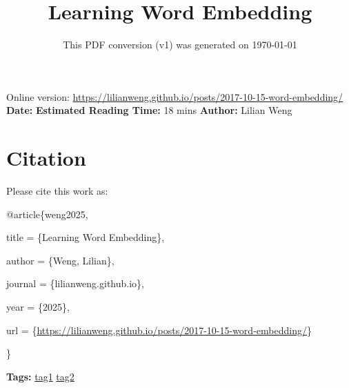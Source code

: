 \documentclass[12pt]{article}
\title{Learning Word Embedding}
\date{This PDF conversion (v1) was generated on \today\footnotemark}
\begin{document}
\maketitle
\begin{center}
    Online version: \url{https://lilianweng.github.io/posts/2017-10-15-word-embedding/} \\
    \textbf{Date:} \quad
    \textbf{Estimated Reading Time:}  18 mins \quad
    \textbf{Author:} Lilian Weng
\end{center}




\newpage
\tableofcontents
\newpage
\vspace{1em}



\section{Citation}
Please cite this work as:


\begin{tcolorbox}[
    colback=black!5!white,
    colframe=black!80!white,
    boxrule=0.5pt,
    arc=2mm,
    left=1mm,
    right=1mm,
    top=1mm,
    bottom=1mm,
    listing only,
    listing options={
      basicstyle=\ttfamily\footnotesize,
      breaklines=true,
      literate={\{}{{\char`\{}}1 {\}}{{\char`\}}}1
    }
  ]
  @article\{weng2025,

    title   = \{Learning Word Embedding\},

    author  = \{Weng, Lilian\},

    journal = \{lilianweng.github.io\},

    year    = \{2025\},

    url     = \{\url{https://lilianweng.github.io/posts/2017-10-15-word-embedding/}\}

  \}
  \end{tcolorbox}



\vspace{2em}
\noindent
\textbf{Tags:}
\href{https://example.com/post}{tag1} \quad
\href{https://example.com/post}{tag2}
\end{document}
